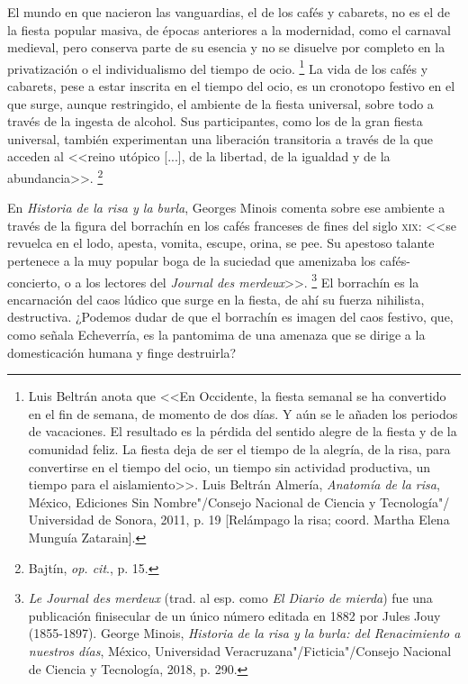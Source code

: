 \documentclass[14pt,twoside,final]{extbook} %
\let\oldfootnote\footnote
\renewcommand\footnote[1]{%
\oldfootnote{\hspace{1mm}#1}}
\begin{document}
El mundo en que nacieron las vanguardias, el de los cafés y cabarets, no es el de la fiesta popular masiva, de épocas anteriores a la modernidad, como el carnaval medieval, pero conserva parte de su esencia y no se disuelve por completo en la privatización o el individualismo del tiempo de ocio.\footnote{Luis Beltrán anota que <<En Occidente\index[lugares]{Occidente}, la fiesta semanal se ha convertido en el fin de semana, de momento de dos días. Y aún se le añaden los periodos de vacaciones. El resultado es la pérdida del sentido alegre de la fiesta y de la comunidad feliz. La fiesta deja de ser el tiempo de la alegría, de la risa, para convertirse en el tiempo del ocio, un tiempo sin actividad productiva, un tiempo para el aislamiento>>. Luis Beltrán Almería, \emph{Anatomía de la risa}, México, Ediciones Sin Nombre"/Consejo Nacional de Ciencia y Tecnología"/ Universidad de Sonora, 2011, p. 19 [Relámpago la risa; coord. Martha Elena Munguía Zatarain].} La vida de los cafés y cabarets, pese a estar inscrita en el tiempo del ocio, es un cronotopo festivo en el que surge, aunque restringido, el ambiente de la fiesta universal, sobre todo a través de la ingesta de alcohol. Sus participantes, como los de la gran fiesta universal, también experimentan una liberación transitoria a través de la que acceden al <<reino utópico [...], de la libertad, de la igualdad y de la abundancia>>.\footnote{Bajtín, \emph{op. cit}., p. 15.}

En \emph{Historia de la risa y la burla}, Georges Minois comenta sobre ese ambiente a través de la figura del borrachín en los cafés franceses de fines del siglo \textsc{xix}: <<se revuelca en el lodo, apesta, vomita, escupe, orina, se pee. Su apestoso talante pertenece a la muy popular boga de la suciedad que amenizaba los cafés-concierto, o a los lectores del \emph{Journal des merdeux}>>.\footnote{\emph{Le Journal des merdeux} (trad. al esp. como \emph{El Diario de mierda}) fue una publicación finisecular de un único número editada en 1882 por Jules Jouy (1855-1897). George Minois, \emph{Historia de la risa y la burla: del Renacimiento a nuestros días}, México, Universidad Veracruzana"/Ficticia"/Consejo Nacional de Ciencia y Tecnología, 2018, p. 290.} El borrachín es la encarnación del caos lúdico que surge en la fiesta, de ahí su fuerza nihilista, destructiva. ¿Podemos dudar de que el borrachín es imagen del caos festivo, que, como señala Echeverría, es la pantomima de una amenaza que se dirige a la domesticación humana y finge destruirla?
\end{document}
